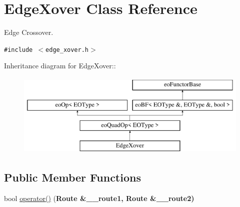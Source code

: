 \hypertarget{classEdgeXover}{
\section{Edge\-Xover Class Reference}
\label{classEdgeXover}
}
Edge Crossover.  


{\tt \#include $<$edge\_\-xover.h$>$}

Inheritance diagram for Edge\-Xover::\begin{figure}[H]
\begin{center}
\leavevmode
\includegraphics[height=4cm]{classEdgeXover}
\end{center}
\end{figure}
\subsection*{Public Member Functions}
\begin{CompactItemize}
\item 
\hypertarget{classEdgeXover_cb1c0a103106a4d3319540cb23163a79}{
bool \hyperlink{classEdgeXover_cb1c0a103106a4d3319540cb23163a79}{operator()} (\bf{Route} \&\_\-\_\-route1, \bf{Route} \&\_\-\_\-route2)}
\label{classEdgeXover_cb1c0a103106a4d3319540cb23163a79}

\end{CompactItemize}
